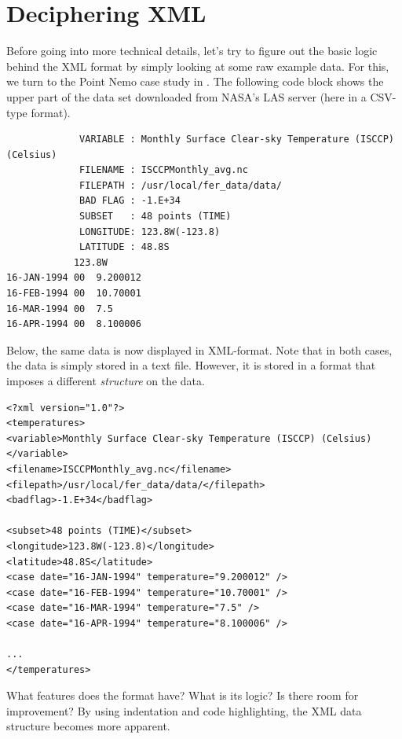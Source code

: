 \documentclass[
  12pt,
]{style/krantz}
\begin{document}
\hypertarget{deciphering-xml}{%
\section{Deciphering XML}\label{deciphering-xml}}

Before going into more technical details, let's try to figure out the basic logic behind the XML format by simply looking at some raw example data. For this, we turn to the Point Nemo case study in \citep{murrell_2009}. The following code block shows the upper part of the data set downloaded from NASA's LAS server (here in a CSV-type format).

\begin{verbatim}
             VARIABLE : Monthly Surface Clear-sky Temperature (ISCCP) (Celsius)
             FILENAME : ISCCPMonthly_avg.nc
             FILEPATH : /usr/local/fer_data/data/
             BAD FLAG : -1.E+34       
             SUBSET   : 48 points (TIME)
             LONGITUDE: 123.8W(-123.8)
             LATITUDE : 48.8S
            123.8W 
16-JAN-1994 00  9.200012
16-FEB-1994 00  10.70001
16-MAR-1994 00  7.5
16-APR-1994 00  8.100006
\end{verbatim}

Below, the same data is now displayed in XML-format. Note that in both cases, the data is simply stored in a text file. However, it is stored in a format that imposes a different \emph{structure} on the data.

\begin{verbatim}
<?xml version="1.0"?>
<temperatures>
<variable>Monthly Surface Clear-sky Temperature (ISCCP) (Celsius)</variable>
<filename>ISCCPMonthly_avg.nc</filename>
<filepath>/usr/local/fer_data/data/</filepath>
<badflag>-1.E+34</badflag>

<subset>48 points (TIME)</subset>
<longitude>123.8W(-123.8)</longitude>
<latitude>48.8S</latitude>
<case date="16-JAN-1994" temperature="9.200012" />
<case date="16-FEB-1994" temperature="10.70001" />
<case date="16-MAR-1994" temperature="7.5" />
<case date="16-APR-1994" temperature="8.100006" />

...
</temperatures>
\end{verbatim}

What features does the format have? What is its logic? Is there room for improvement? By using indentation and code highlighting, the XML data structure becomes more apparent.
\end{document}
